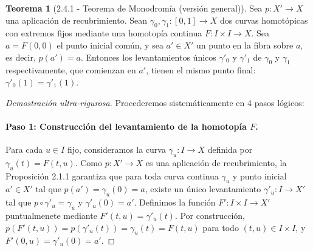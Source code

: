 \documentclass[11pt,a4paper]{article}
\theoremstyle{definition}
\newtheorem{teorema}{Teorema}[section]
\theoremstyle{remark}
\numberwithin{equation}{section}
\begin{document}
\begin{teorema}[2.4.1 - Teorema de Monodromía (versión general)]
Sea $p : X' \to X$ una aplicación de recubrimiento. Sean $\gamma_0, \gamma_1 : [0,1] \to X$ dos curvas homotópicas con extremos fijos mediante una homotopía continua $F : I \times I \to X$. Sea $a = F(0,0)$ el punto inicial común, y sea $a' \in X'$ un punto en la fibra sobre $a$, es decir, $p(a') = a$. Entonces los levantamientos únicos $\gamma'_0$ y $\gamma'_1$ de $\gamma_0$ y $\gamma_1$ respectivamente, que comienzan en $a'$, tienen el mismo punto final: $\gamma'_0(1) = \gamma'_1(1)$.
\end{teorema}
\begin{proof}[Demostración ultra-rigurosa]
Procederemos sistemáticamente en 4 pasos lógicos:
\paragraph{Paso 1: Construcción del levantamiento de la homotopía $F$.} Para cada $u \in I$ fijo, consideramos la curva $\gamma_u : I \to X$ definida por $\gamma_u(t) = F(t,u)$. Como $p: X' \to X$ es una aplicación de recubrimiento, la Proposición 2.1.1 garantiza que para toda curva continua $\gamma_u$ y punto inicial $a' \in X'$ tal que $p(a') = \gamma_u(0) = a$, existe un único levantamiento $\gamma'_u : I \to X'$ tal que $p \circ \gamma'_u = \gamma_u$ y $\gamma'_u(0) = a'$. 
Definimos la función $F' : I \times I \to X'$ puntualmenete mediante $F'(t,u) = \gamma'_u(t)$. Por construcción, $p(F'(t,u)) = p(\gamma'_u(t)) = \gamma_u(t) = F(t,u)$ para todo $(t,u) \in I \times I$, y $F'(0,u) = \gamma'_u(0) = a'$. 


\end{proof}
\end{document}
